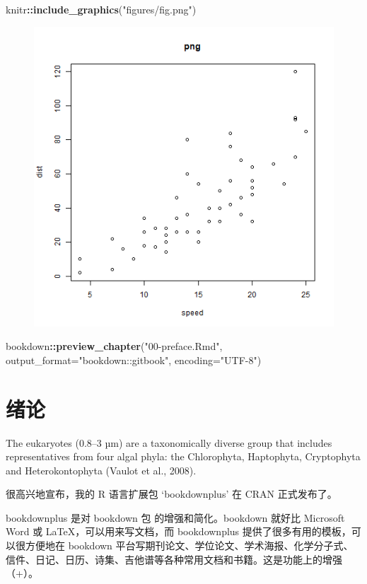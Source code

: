 \documentclass[UTF8, openany]{pkuthss}
\newenvironment{Shaded}{\begin{snugshade}}{\end{snugshade}}
\newcommand{\KeywordTok}[1]{\textcolor[rgb]{0.13,0.29,0.53}{\textbf{{#1}}}}
\newcommand{\DataTypeTok}[1]{\textcolor[rgb]{0.13,0.29,0.53}{{#1}}}
\newcommand{\StringTok}[1]{\textcolor[rgb]{0.31,0.60,0.02}{{#1}}}
\newcommand{\OperatorTok}[1]{\textcolor[rgb]{0.81,0.36,0.00}{\textbf{{#1}}}}
\newcommand{\NormalTok}[1]{{#1}}
\begin{document}
\begin{Shaded}
\begin{Highlighting}[]
\NormalTok{knitr}\OperatorTok{::}\KeywordTok{include_graphics}\NormalTok{(}\StringTok{"figures/fig.png"}\NormalTok{)}
\end{Highlighting}
\end{Shaded}

\begin{figure}[!htp]

\begin{center}\includegraphics[width=0.328\linewidth]{figures/fig} \end{center}

\end{figure}

\begin{Shaded}
\begin{Highlighting}[]
\NormalTok{bookdown}\OperatorTok{::}\KeywordTok{preview_chapter}\NormalTok{(}\StringTok{"00-preface.Rmd"}\NormalTok{, }
  \DataTypeTok{output_format=}\StringTok{"bookdown::gitbook"}\NormalTok{, }\DataTypeTok{encoding=}\StringTok{"UTF-8"}\NormalTok{)}
\end{Highlighting}
\end{Shaded}

\cleardoublepage

\mainmatter

\hypertarget{chap0}{%
\chapter{绪论}\label{chap0}}

The eukaryotes (0.8--3 µm) are a taxonomically diverse group that includes representatives from four algal phyla: the Chlorophyta, Haptophyta, Cryptophyta and Heterokontophyta (Vaulot et al., 2008).\citep{buitenhuis2012picophytoplankton}

很高兴地宣布，我的 R 语言扩展包 `bookdownplus' \citep{R-bookdownplus} 在 CRAN 正式发布了。

bookdownplus 是对 bookdown 包 \citep{R-bookdown} 的增强和简化。bookdown 就好比 Microsoft Word 或 LaTeX，可以用来写文档，而 bookdownplus 提供了很多有用的模板，可以很方便地在 bookdown 平台写期刊论文、学位论文、学术海报、化学分子式、信件、日记、日历、诗集、吉他谱等各种常用文档和书籍。这是功能上的增强（+）。
\end{document}

